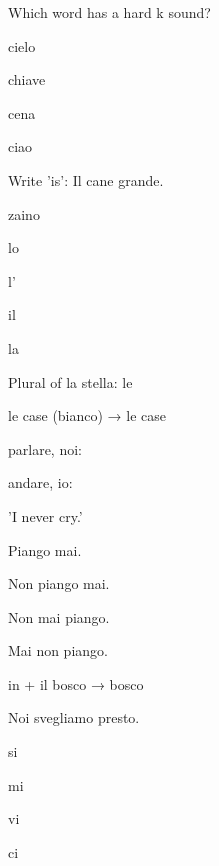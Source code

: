 \documentclass[11pt,a4paper,twoside,openright]{book}
\newcommand{\blank}{\underline{\hspace{2.6cm}}}
\begin{document}
\begin{exercises}
\item\label{ex:diag-1}\relax Which word has a hard k sound?\par\nopagebreak\begin{options}
\item\relax cielo
\item\relax chiave
\item\relax cena
\item\relax ciao
\end{options}
\item\label{ex:diag-2}\relax Write 'is': Il cane \blank{} grande.
\item\label{ex:diag-3}\relax \blank{} zaino\par\nopagebreak\begin{options}
\item\relax lo
\item\relax l'
\item\relax il
\item\relax la
\end{options}
\item\label{ex:diag-4}\relax Plural of la stella: le \blank{}
\item\label{ex:diag-5}\relax le case (bianco) → le case \blank{}
\item\label{ex:diag-6}\relax parlare, noi: \blank{}
\item\label{ex:diag-7}\relax andare, io: \blank{}
\item\label{ex:diag-8}\relax 'I never cry.'\par\nopagebreak\begin{options}
\item\relax Piango mai.
\item\relax Non piango mai.
\item\relax Non mai piango.
\item\relax Mai non piango.
\end{options}
\item\label{ex:diag-9}\relax in + il bosco → \blank{} bosco
\item\label{ex:diag-10}\relax Noi \blank{} svegliamo presto.\par\nopagebreak\begin{options}
\item\relax si
\item\relax mi
\item\relax vi
\item\relax ci
\end{options}

\end{exercises}
\end{document}
